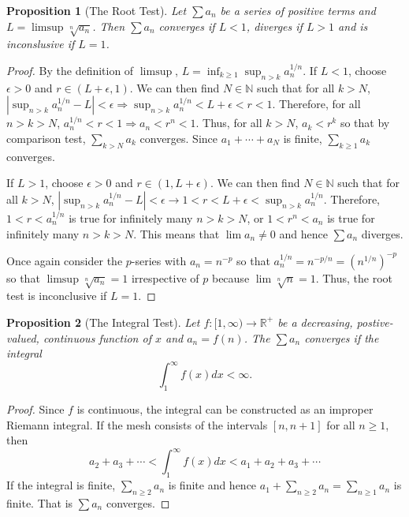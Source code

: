 \documentclass{article}
\theoremstyle{plain}
\numberwithin{thm}{section}
\theoremstyle{plain}
\newtheorem{prop}{Proposition}
\numberwithin{prop}{section}
\theoremstyle{definition}
\numberwithin{defn}{section}
\theoremstyle{remark}
\numberwithin{equation}{section}
\begin{document}
\begin{prop}[The Root Test]\label{s4p5}
Let $\sum a_n$ be a series of positive terms and $L = \limsup \sqrt[n]{a_n}$.
Then $\sum a_n$ converges if $L < 1$, diverges if $L > 1$ and is inconslusive
if $L = 1$.
\end{prop}
\begin{proof}
By the definition of $\limsup$, $L = \inf_{k \ge 1}\sup_{n > k}a_n^{1/n}$. If
$L < 1$, choose $\epsilon > 0$ and $r \in (L + \epsilon, 1)$. We can then find
$N \in \mathbb{N}$ such that for all $k > N$, $|\sup_{n>k}a_n^{1/n} - L| <
\epsilon \Rightarrow \sup_{n>k}a_n^{1/n} < L + \epsilon < r < 1$. Therefore,
for all $n > k > N$, $a_n^{1/n} < r < 1 \Rightarrow a_n < r^n < 1$. Thus, for 
all $k > N$, $a_k < r^k$ so that by comparison test, $\sum_{k > N}a_k$ 
converges. Since $a_1 + \cdots + a_N$ is finite, $\sum_{k \ge 1} a_k$ converges.

If $L > 1$, choose $\epsilon > 0$ and $r \in (1, L + \epsilon)$. We can then
find $N \in \mathbb{N}$ such that for all $k > N$, $|\sup_{n > k} a_n^{1/n} -
L| < \epsilon \rightarrow 1 < r < L + \epsilon < \sup_{n>k} a_n^{1/n}$. 
Therefore, $1 < r < a_n^{1/n}$ is true for infinitely many $n > k > N$, or
$1 < r^n < a_n$ is true for infinitely many $n > k > N$. This means that
$\lim a_n \ne 0$ and hence $\sum a_n$ diverges.

Once again consider the $p$-series with $a_n = n^{-p}$ so that $a_n^{1/n} = 
n^{-p/n} = (n^{1/n})^{-p}$ so that $\limsup\sqrt[n]{a_n} = 1$ irrespective of
$p$ because $\lim\sqrt[n]{n} = 1$. Thus, the root test is inconclusive if $L=1$.
\end{proof}

\begin{prop}[The Integral Test]\label{s4p6}
Let $f:[1, \infty) \rightarrow \mathbb{R}^+$ be a decreasing, postive-valued,
continuous function of $x$ and $a_n = f(n)$. The $\sum a_n$ converges if the 
integral
\[
\int_1^\infty f(x)dx < \infty.
\]
\end{prop}
\begin{proof}
Since $f$ is continuous, the integral can be constructed as an improper Riemann
integral. If the mesh consists of the intervals $[n, n+1]$ for all $n \ge 1$,
then
\[
a_2 + a_3 + \cdots < \int_1^\infty f(x)dx < a_1 + a_2 + a_3 + \cdots
\]
If the integral is finite, $\sum_{n \ge 2}a_n$ is finite and hence $a_1+\sum_{n
\ge 2} a_n = \sum_{n \ge 1}a_n$ is finite. That is $\sum a_n$ converges.
\end{proof}
\end{document}

